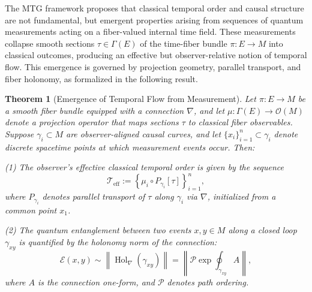 \documentclass[11pt]{article}
\newtheorem{theorem}{Theorem}
\begin{document}
The MTG framework proposes that classical temporal order and causal structure are not fundamental, but emergent properties arising from sequences of quantum measurements acting on a fiber-valued internal time field. These measurements collapse smooth sections \( \tau \in \Gamma(E) \) of the time-fiber bundle \( \pi: E \to M \) into classical outcomes, producing an effective but observer-relative notion of temporal flow. This emergence is governed by projection geometry, parallel transport, and fiber holonomy, as formalized in the following result.

\begin{theorem}[Emergence of Temporal Flow from Measurement]
Let \( \pi: E \to M \) be a smooth fiber bundle equipped with a connection \( \nabla \), and let \( \mu: \Gamma(E) \to \mathcal{O}(M) \) denote a projection operator that maps sections \( \tau \) to classical fiber observables. Suppose \( \gamma_i \subset M \) are observer-aligned causal curves, and let \( \{x_i\}_{i=1}^n \subset \gamma_i \) denote discrete spacetime points at which measurement events occur. Then:

(1) The observer’s effective classical temporal order is given by the sequence
\[
\mathcal{T}_{\mathrm{eff}} := \left\{ \mu_i \circ P_{\gamma_i}[\tau] \right\}_{i=1}^n,
\]
where \( P_{\gamma_i} \) denotes parallel transport of \( \tau \) along \( \gamma_i \) via \( \nabla \), initialized from a common point \( x_1 \).

(2) The quantum entanglement between two events \( x, y \in M \) along a closed loop \( \gamma_{xy} \) is quantified by the holonomy norm of the connection:
\[
\mathcal{E}(x, y) \sim \left\| \operatorname{Hol}_\nabla(\gamma_{xy}) \right\| = \left\| \mathcal{P} \exp \oint_{\gamma_{xy}} A \right\|,
\]
where \( A \) is the connection one-form, and \( \mathcal{P} \) denotes path ordering.
\end{theorem}
\end{document}
